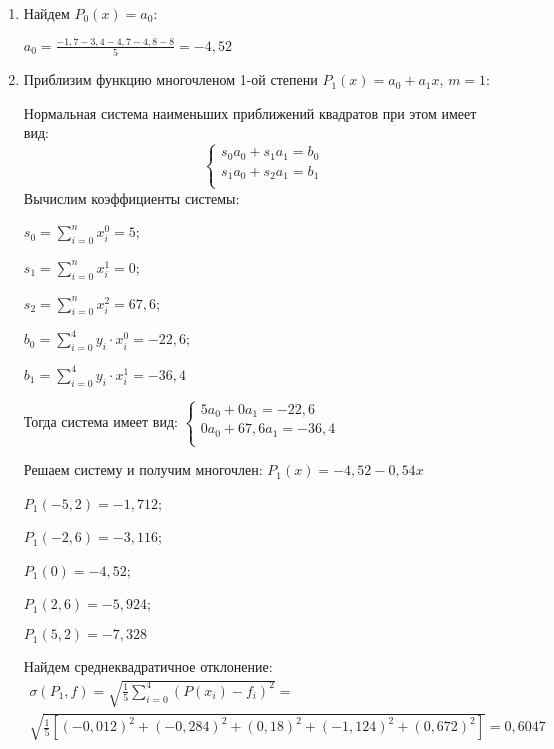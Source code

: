 \documentclass[a4paper,12pt]{article} %
\begin{document}
\begin{enumerate}

\item Найдем $P_0(x) = a_0$:

$a_0 = \frac{-1,7 - 3,4 - 4,7 - 4,8 - 8}{5} = -4,52$

\item Приблизим функцию многочленом 1-ой степени $P_1(x) = a_0 + a_1x$, $m = 1$:

Нормальная система наименьших приближений квадратов при этом имеет вид:
$$
\begin{cases}
    s_0 a_0 + s_1 a_1 = b_0 \\
    s_1 a_0 + s_2 a_1 = b_1 \\
\end{cases}
$$
Вычислим коэффициенты системы: 
\begin{center}
    $s_0 = \sum_{i = 0}^{n} x_i^0 = 5 $;

    $s_1 = \sum_{i = 0}^{n} x_i^1 = 0 $;

    $s_2 = \sum_{i = 0}^{n} x_i^2 = 67,6 $;

    $b_0 = \sum_{i = 0}^{4} y_i \cdot x_i^0 = -22,6 $;

    $b_1 = \sum_{i = 0}^{4} y_i \cdot x_i^1 = -36,4 $
\end{center}

Тогда система имеет вид:
$
\begin{cases}
    5a_0 + 0a_1 = -22,6 \\
    0a_0 + 67,6a_1 = -36,4  \\
\end{cases}
$

Решаем систему и получим многочлен: $P_1(x) = -4,52 - 0,54x$

\begin{center}
    $P_1(-5,2) = -1,712$; 
    
    $P_1(-2,6) = -3,116$; 
    
    $P_1(0) = -4,52$;
    
    $P_1(2,6) = -5,924$; 
    
    $P_1(5,2) = -7,328$
\end{center}

Найдем среднеквадратичное отклонение:
$$
    \begin{gathered}
        \sigma(P_1, f) = \sqrt{\frac{1}{5} \sum_{i = 0}^4(P(x_i) - f_i)^2} = \\ \sqrt{\frac{1}{5} [(-0,012)^2 + (-0,284)^2 + (0,18)^2 + (-1,124)^2 + (0,672)^2]} = 0,6047
    \end{gathered}
$$


\end{enumerate}
\end{document}
